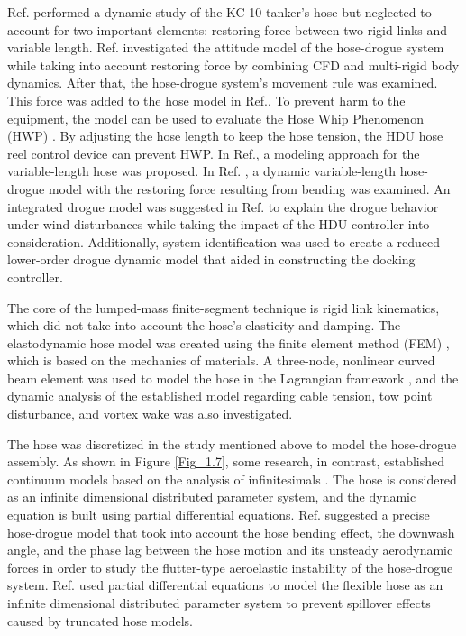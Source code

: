 Ref.\cite{vassberg2002dynamic} performed a dynamic study of the KC-10
tanker's hose but neglected to account for two important elements:
restoring force between two rigid links and variable length. Ref.\cite{yin2022hose}
investigated the attitude model of the hose-drogue system while taking
into account restoring force by combining CFD and multi-rigid body
dynamics. After that, the hose-drogue system's movement rule was examined.
This force was added to the hose model in Ref.\cite{HoseLink-2007}.
To prevent harm to the equipment, the model can be used to evaluate
the Hose Whip Phenomenon (HWP) \cite{ro2011dynamics}. By adjusting
the hose length to keep the hose tension, the HDU hose reel control
device can prevent HWP. In Ref.\cite{vassberg2003numerical}, a modeling
approach for the variable-length hose was proposed. In Ref. \cite{wang2014dynamic},
a dynamic variable-length hose-drogue model with the restoring force
resulting from bending was examined. An integrated drogue model was
suggested in Ref. \cite{dai2019hose} to explain the drogue behavior
under wind disturbances while taking the impact of the HDU controller
into consideration. Additionally, system identification was used to
create a reduced lower-order drogue dynamic model that aided in constructing
the docking controller. 

The core of the lumped-mass finite-segment technique is rigid link
kinematics, which did not take into account the hose's elasticity
and damping. The elastodynamic hose model was created using the finite
element method (FEM) \cite{zhu2006elastodynamic}, which is based
on the mechanics of materials. A three-node, nonlinear curved beam
element was used to model the hose in the Lagrangian framework \cite{zhu2007modeling},
and the dynamic analysis of the established model regarding cable
tension, tow point disturbance, and vortex wake was also investigated. 

The hose was discretized in the study mentioned above to model the
hose-drogue assembly. As shown in Figure \ref{Fig_1.7}, some research,
in contrast, established continuum models based on the analysis of
infinitesimals . The hose is considered as an infinite dimensional
distributed parameter system, and the dynamic equation is built using
partial differential equations. Ref. \cite{paniagua2021aeroelastic}
suggested a precise hose-drogue model that took into account the hose
bending effect, the downwash angle, and the phase lag between the
hose motion and its unsteady aerodynamic forces in order to study
the flutter-type aeroelastic instability of the hose-drogue system.
Ref. \cite{liu2020vibration} used partial differential equations
to model the flexible hose as an infinite dimensional distributed
parameter system to prevent spillover effects caused by truncated
hose models. 

